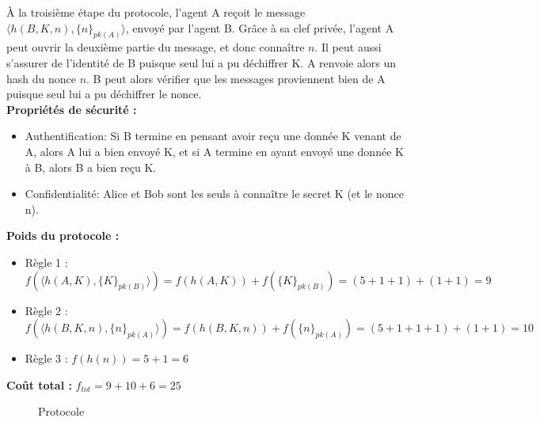 \documentclass[10pt,a4paper]{article}
\begin{document}
À la troisième étape du protocole, l'agent A reçoit le message $\langle h(B, K, n), \{n\}_{pk(A)} \rangle $, envoyé par l'agent B.
Grâce à sa clef privée, l'agent A peut ouvrir la deuxième partie du message, et donc connaître $n$.
Il peut aussi s'assurer de l'identité de B puisque seul lui a pu déchiffrer K.
A renvoie alors un hash du nonce $n$. B peut alors vérifier que les messages proviennent bien de A puisque seul lui a pu déchiffrer le nonce.\\


\textbf{Propriétés de sécurité :}
\begin{itemize}
 \item Authentification: Si B termine en pensant avoir reçu une donnée K venant de A, alors A lui a bien envoyé K, et si A termine en ayant envoyé une donnée K à B, alors B a bien reçu K.
 \item Confidentialité: Alice et Bob sont les seuls à connaître le secret K (et le nonce n).
\end{itemize}


\textbf{Poids du protocole :}
\begin{itemize}
\item Règle 1 : $f( \langle h(A, K), \{K\}_{pk(B)} \rangle ) = f ( h(A, K) ) + f ( \{K\}_{pk(B)} ) = (5 + 1 + 1) + (1 + 1) = 9 $
\item Règle 2 : $f(\langle h(B, K, n), \{n\}_{pk(A)} \rangle) = f(h(B, K, n)) + f(\{n\}_{pk(A)}) = (5 + 1 + 1 + 1) + (1 + 1) = 10 $
\item Règle 3 : $f(h(n)) = 5 + 1 = 6$
\end{itemize}

\textbf{Coût total :} $f_{tot} = 9 + 10 + 6 = 25$

\begin{figure}[!ht]
\centering
\begin{msc}{Protocole}
  \nextlevel
  \nextlevel[2]
  \nextlevel
  \nextlevel[2]
  \nextlevel
  \nextlevel
\end{msc}
\end{figure}

\newpage
\end{document}

